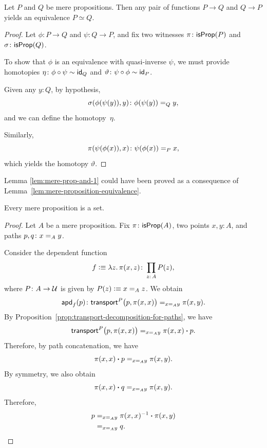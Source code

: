 \begin{lem}\label{lem:mere-proposition-equivalence}
    Let\/ $P$ and\/ $Q$ be mere propositions. Then any pair of functions\/ $P\to Q$ and\/ $Q\to P$ yields an equivalence\/ $P\simeq Q$.
\end{lem}

\begin{proof}
    Let $\phi\colon P\to Q$ and $\psi\colon Q\to P$, and fix two witnesses $\pi\colon\fun{isProp}(P)$ and $\sigma\colon\fun{isProp}(Q)$. 

    To show that $\phi$ is an equivalence with quasi-inverse $\psi$, we must provide homotopies $\eta\colon\phi\circ\psi\sim\id_Q$ and $\vartheta\colon\psi\circ\phi\sim\id_P$.

    Given any $y\colon Q$, by hypothesis, 
    \[
        \sigma(\phi(\psi(y)),y)\colon\phi(\psi(y))\eq Qy,
    \]
    and we can define the  homotopy~$\eta$.

    Similarly,
    \[
        \pi(\psi(\phi(x)),x)\colon\psi(\phi(x))\eq Px,
    \]
    which yields the homotopy $\vartheta$.
\end{proof}

\begin{rem}
    Lemma \ref{lem:mere-prop-and-1} could have been proved as a consequence of Lemma~\ref{lem:mere-proposition-equivalence}.
\end{rem}

\begin{lem}\label{lem:mere-propositions-are-sets}
    Every mere proposition is a set.
\end{lem}

\begin{proof}
    Let $A$ be a mere proposition. Fix $\pi\colon\fun{isProp}(A)$, two points $x,y\colon A$, and paths $p,q\colon x\eq{A}y$. 
    
    Consider the dependent function
    \[
        f\defeq\lambda z.\,\pi(x,z)\colon\prod_{z\colon A}P(z),
    \]
    where $P\colon A\to\univ$ is given by $P(z)\mathrel{\vcentcolon}\equiv x\mathrel{=_{A}}z$. We obtain
    \[
        \fun{apd}_f(p)\colon\fun{transport}^P\bigl(p,\pi(x,x)\bigr)\eq{x\eq{A}y}\pi(x,y).
    \]
    By Proposition~\ref{prop:transport-decomposition-for-paths}, we have
    \[
        \mathsf{transport}^P\bigl(p,\pi(x,x)\bigr)\mathrel{=_{x\mathrel{=_{A}}y}}\pi(x,x)\mathbin{\boldsymbol{\cdot}} p.
    \]
    Therefore, by path concatenation, we have
    \[
        \pi(x,x)\mathbin{\boldsymbol{\cdot}} p\mathrel{=_{x\mathrel{=_{A}}y}}\pi(x,y).
    \]
    By symmetry, we also obtain
    \[
        \pi(x,x)\mathbin{\boldsymbol{\cdot}} q\mathrel{=_{x\mathrel{=_{A}}y}}\pi(x,y).
    \]
    Therefore,
    \begin{align*}
        p &\mathrel{=_{x\mathrel{=_{A}}y}} \pi(x,x)^{-1}\mathbin{\boldsymbol{\cdot}}\pi(x,y) \\
          &\mathrel{=_{x\mathrel{=_{A}}y}} q.
    \end{align*}
\end{proof}

